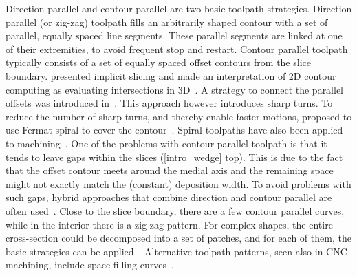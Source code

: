 Direction parallel and contour parallel are two basic toolpath strategies.
Direction parallel (or zig-zag) toolpath fills an arbitrarily shaped contour with a set of parallel, equally spaced line segments.
These parallel segments are linked at one of their extremities, to avoid frequent stop and restart.
Contour parallel toolpath typically consists of a set of equally spaced offset contours from the slice boundary.
\citeauthor{steuben2016implicit} presented implicit slicing and made an interpretation of 2D contour computing as evaluating intersections in 3D~\cite{steuben2016implicit}.
A strategy to connect the parallel offsets was introduced in~\cite{KUIPERS2019CAD}. This approach however introduces sharp turns.
To reduce the number of sharp turns, and thereby enable faster motions, \citeauthor{Zhao2016} proposed to use Fermat spiral to cover the contour~\cite{Zhao2016}. 
Spiral toolpaths have also been applied to machining~\cite{Held2009,Huang2017}.
One of the problems with contour parallel toolpath is that it tends to leave gaps within the slices (\cref{intro_wedge} top).
This is due to the fact that the offset contour meets around the medial axis and the remaining space might not exactly match the (constant) deposition width.
To avoid problems with such gaps, hybrid approaches that combine direction and contour parallel are often used~\cite{Mcmains2000DETC,Jin2013adaptive}.
Close to the slice boundary, there are a few contour parallel curves, while in the interior there is a zig-zag pattern.
For complex shapes, the entire cross-section could be decomposed into a set of patches, and for each of them, the basic strategies can be applied~\cite{Ding2014,Jin2017RCIM}.
Alternative toolpath patterns, seen also in CNC machining, include space-filling curves~\cite{Cox1994CAD,Griffiths1994,Shaikh2016}.

